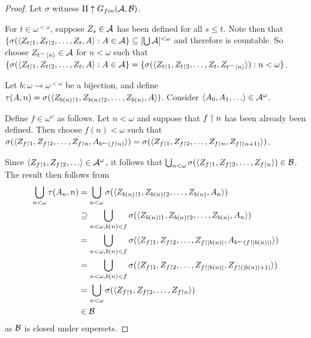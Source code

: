 \documentclass{amsart}
\theoremstyle{plain}
\theoremstyle{definition}
\theoremstyle{remark}
\theoremstyle{plain}
\theoremstyle{definition}
\theoremstyle{remark}
\begin{document}
\begin{proof}
  Let \(\sigma\) witness \(\mathrm{II}\uparrow G_{fin}(\mathcal{A},\mathcal{B})\).

  For \(t\in\omega^{<\omega}\), suppose
  \(Z_s\in\mathcal{A}\) has been defined for all \(s\leq t\). Note then that
  \(
    \{\sigma(\langle Z_{t\restriction1},Z_{t\restriction2},\dots,Z_t,A\rangle:A\in\mathcal{A}\}
      \subseteq
    [\bigcup\mathcal{A}]^{<\omega}
  \)
  and therefore is countable.
  So choose \(Z_{t{^\frown}\langle n\rangle}\in\mathcal{A}\) for \(n<\omega\) such that
  \(
    \{\sigma(\langle Z_{t\restriction1},Z_{t\restriction2},\dots,Z_t,A\rangle:A\in\mathcal{A}\}
      =
    \{\sigma(\langle Z_{t\restriction1},Z_{t\restriction2},\dots,Z_t,Z_{t{^\frown}\langle n\rangle}\rangle):n<\omega\}
  \).

  Let \(b:\omega\to\omega^{<\omega}\) be a bijection,
  and define
  \(\tau(A,n)=\sigma(\langle Z_{b(n)\restriction 1},Z_{b(n)\restriction 2},\dots,Z_{b(n)},A\rangle)\).
  Consider \(\<A_0,A_1,\dots\>\in\mc A^\omega\).

  Define \(f\in\omega^\omega\) as follows.
  Let \(n<\omega\) and suppose that \(f\restriction n\) has been already
  been defined. Then choose \(f(n)<\omega\) such that
  \(
    \sigma(\langle Z_{f\restriction1},Z_{f\restriction2},\dots,Z_{f\restriction n},A_{b^{\leftarrow}(f\restriction n)}\rangle)
      =
    \sigma(\langle Z_{f\restriction1},Z_{f\restriction2},\dots,Z_{f\restriction n},Z_{f\restriction (n+1)}\rangle)
  \).

  Since \(\<Z_{f\rest1},Z_{f\rest2},\dots\>\in\mc A^\omega\), it follows
  that
  \(
    \bigcup_{n<\omega}\sigma(\langle Z_{f\restriction1},Z_{f\restriction2},\dots,Z_{f\restriction n}\rangle)
      \in
    \mathcal{B}
  \).
  The result then follows from
  \begin{align*}
    \bigcup_{n<\omega}\tau(A_n,n)
      & =
    \bigcup_{n<\omega}
    \sigma(\langle Z_{b(n)\restriction 1},Z_{b(n)\restriction 2},\dots,Z_{b(n)},A_n\rangle)
      \\ & \supseteq
    \bigcup_{n<\omega,b(n)<f}
    \sigma(\langle Z_{b(n)\restriction 1},Z_{b(n)\restriction 2},\dots,Z_{b(n)},A_n\rangle)
      \\ & =
    \bigcup_{n<\omega,b(n)<f}
    \sigma(\langle Z_{f\restriction 1},Z_{f\restriction 2},\dots,Z_{f\restriction|b(n)|},A_{b^{\leftarrow}(f\restriction|b(n)|)}\rangle)
      \\ & =
    \bigcup_{n<\omega,b(n)<f}
    \sigma(\langle Z_{f\restriction 1},Z_{f\restriction 2},\dots,Z_{f\restriction|b(n)|},Z_{f\restriction(|b(n)|+1)}\rangle)
      \\ & =
    \bigcup_{n<\omega}
    \sigma(\langle Z_{f\restriction 1},Z_{f\restriction 2},\dots,Z_{f\restriction n}\rangle)
      \\ & \in
    \mathcal{B}
  \end{align*}
  as \(\mathcal{B}\) is closed under supersets.
\end{proof}
\end{document}
